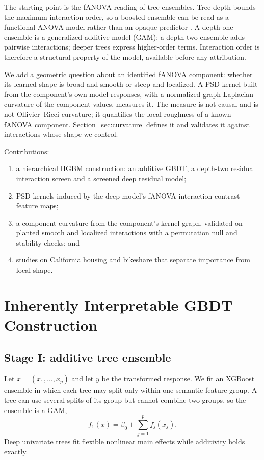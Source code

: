 \documentclass[11pt]{article}
\newcommand{\IIGBM}{\textsc{IIGBM}}
\begin{document}
The starting point is the fANOVA reading of tree ensembles. Tree depth bounds
the maximum interaction order, so a boosted ensemble can be read as a functional
ANOVA model rather than an opaque predictor \cite{Sudjianto2025,Hu2023}. A
depth-one ensemble is a generalized additive model (GAM); a depth-two ensemble
adds pairwise interactions; deeper trees express higher-order terms. Interaction
order is therefore a structural property of the model, available before any
attribution.

We add a geometric question about an identified fANOVA component: whether its
learned shape is broad and smooth or steep and localized. A PSD kernel built
from the component's own model responses, with a normalized graph-Laplacian
curvature of the component values, measures it. The measure is not causal and
is not Ollivier--Ricci curvature; it quantifies the local roughness of a known
fANOVA component. Section~\ref{sec:curvature} defines it and validates it against
interactions whose shape we control.

Contributions:
\begin{enumerate}
\item a hierarchical \IIGBM{} construction: an additive GBDT, a depth-two
residual interaction screen and a screened deep residual model;
\item PSD kernels induced by the deep model's fANOVA interaction-contrast feature
maps;
\item a component curvature from the component's kernel graph, validated on
planted smooth and localized interactions with a permutation null and stability
checks; and
\item studies on California housing and bikeshare that separate importance from
local shape.
\end{enumerate}

\section{Inherently Interpretable GBDT Construction}

\subsection{Stage I: additive tree ensemble}

Let $x=(x_1,\ldots,x_p)$ and let $y$ be the transformed response. We fit an
XGBoost ensemble in which each tree may split only within one semantic feature
group. A tree can use several splits of its group but cannot combine two groups,
so the ensemble is a GAM,
\begin{equation}
 f_1(x)=\beta_0+\sum_{j=1}^{p} f_j(x_j).
\end{equation}
Deep univariate trees fit flexible nonlinear main effects while additivity holds
exactly.
\end{document}
